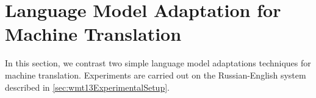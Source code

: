 % 




\section{Language Model Adaptation for Machine Translation}
\label{sec:domainAdaptationLM}

In this section, we contrast two simple language model adaptations
techniques for machine translation. Experiments are carried out %
on the Russian-English system described in \autoref{sec:wmt13ExperimentalSetup}.

